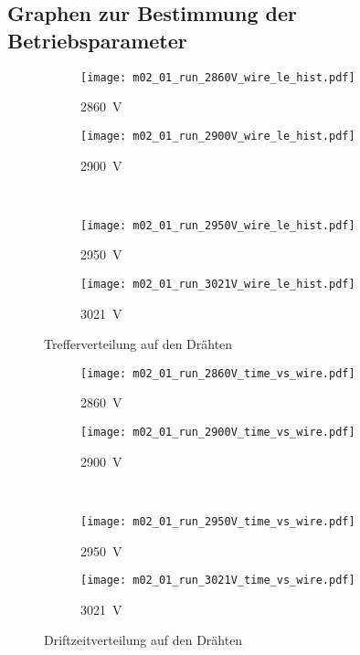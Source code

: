 \documentclass[11pt, ngerman, fleqn, DIV=15, headinclude, BCOR=2cm]{scrreprt}
\begin{document}
\begin{appendix}

	\chapter{Graphen zur Bestimmung der Betriebsparameter}


	\begin{figure}
		\centering
	\begin{subfigure}[a]{0.45 \textwidth}
		\texttt{[image: m02\_01\_run\_2860V\_wire\_le\_hist.pdf]}
		\caption{%
			\SI{2860}{\volt}
		}
		\label{fig:m02_01_run_2860V_wire_le_hist}
	\end{subfigure}
	\begin{subfigure}[a]{0.45 \textwidth}
		\texttt{[image: m02\_01\_run\_2900V\_wire\_le\_hist.pdf]}
		\caption{%
			\SI{2900}{\volt}
		}
		\label{fig:m02_01_run_2900V_wire_le_hist}
	\end{subfigure}\\
	\begin{subfigure}[a]{0.45 \textwidth}
		\texttt{[image: m02\_01\_run\_2950V\_wire\_le\_hist.pdf]}
		\caption{%
			\SI{2950}{\volt}
		}
		\label{fig:m02_01_run_2950V_wire_le_hist}
	\end{subfigure}
	\begin{subfigure}[a]{0.45 \textwidth}
		\texttt{[image: m02\_01\_run\_3021V\_wire\_le\_hist.pdf]}
		\caption{%
			\SI{3021}{\volt}
		}
		\label{fig:m02_01_run_3021V_wire_le_hist}
	\end{subfigure}
	\caption{%
		Trefferverteilung auf den Drähten
	}
	\label{fig:m02_01_wire_le_hist}
	\end{figure}

	\begin{figure}
		\centering
	\begin{subfigure}[a]{0.45 \textwidth}
		\texttt{[image: m02\_01\_run\_2860V\_time\_vs\_wire.pdf]}
		\caption{%
			\SI{2860}{\volt}
		}
		\label{fig:m02_01_run_2860V_time_vs_wire}
	\end{subfigure}
	\begin{subfigure}[a]{0.45 \textwidth}
		\texttt{[image: m02\_01\_run\_2900V\_time\_vs\_wire.pdf]}
		\caption{%
			\SI{2900}{\volt}
		}
		\label{fig:m02_01_run_2900V_time_vs_wire}
	\end{subfigure}
	\\
	\begin{subfigure}[a]{0.45 \textwidth}
		\texttt{[image: m02\_01\_run\_2950V\_time\_vs\_wire.pdf]}
		\caption{%
			\SI{2950}{\volt}
		}
		\label{fig:m02_01_run_2950V_time_vs_wire}
	\end{subfigure}
	\begin{subfigure}[a]{0.45 \textwidth}
		\texttt{[image: m02\_01\_run\_3021V\_time\_vs\_wire.pdf]}
		\caption{%
			\SI{3021}{\volt}
		}
		\label{fig:m02_01_run_3021V_time_vs_wire}
	\end{subfigure}
	\caption{%
		Driftzeitverteilung auf den Drähten
	}
	\label{fig:m02_01_time_vs_wire}
	\end{figure}


\end{appendix}
\end{document}
